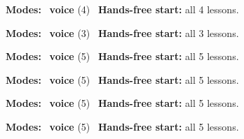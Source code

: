 \expandafter\def\csname hlchaptermodality42\endcsname{%
  {\small\noindent
    \textbf{Modes:} \hlvoicesign{}~\textbf{voice} (4)\quad
    \hlvoicesign{}~\textbf{Hands-free start:} all 4 lessons.%
    \par}\medskip
}

\expandafter\def\csname hlchaptermodality43\endcsname{%
  {\small\noindent
    \textbf{Modes:} \hlvoicesign{}~\textbf{voice} (3)\quad
    \hlvoicesign{}~\textbf{Hands-free start:} all 3 lessons.%
    \par}\medskip
}

\expandafter\def\csname hlchaptermodality44\endcsname{%
  {\small\noindent
    \textbf{Modes:} \hlvoicesign{}~\textbf{voice} (5)\quad
    \hlvoicesign{}~\textbf{Hands-free start:} all 5 lessons.%
    \par}\medskip
}

\expandafter\def\csname hlchaptermodality45\endcsname{%
  {\small\noindent
    \textbf{Modes:} \hlvoicesign{}~\textbf{voice} (5)\quad
    \hlvoicesign{}~\textbf{Hands-free start:} all 5 lessons.%
    \par}\medskip
}

\expandafter\def\csname hlchaptermodality46\endcsname{%
  {\small\noindent
    \textbf{Modes:} \hlvoicesign{}~\textbf{voice} (5)\quad
    \hlvoicesign{}~\textbf{Hands-free start:} all 5 lessons.%
    \par}\medskip
}

\expandafter\def\csname hlchaptermodality47\endcsname{%
  {\small\noindent
    \textbf{Modes:} \hlvoicesign{}~\textbf{voice} (5)\quad
    \hlvoicesign{}~\textbf{Hands-free start:} all 5 lessons.%
    \par}\medskip
}
